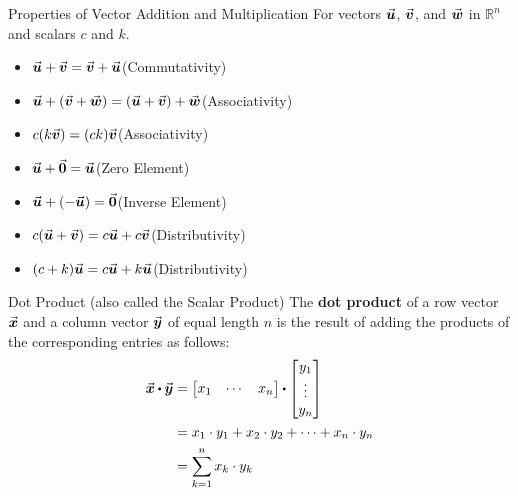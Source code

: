 \documentclass{beamer}
\begin{document}
\begin{frame}
\begin{block}{Properties of Vector Addition and Multiplication}
For vectors ${\vec{\boldsymbol{u}}}$, ${\vec{\boldsymbol{v}}}$, and ${\vec{\boldsymbol{w}}}$ in $\mathbb{R}^n$ and scalars $c$ and $k$.\begin{itemize}
\item ${\vec{\boldsymbol{u}}}+{\vec{\boldsymbol{v}}}={\vec{\boldsymbol{v}}}+{\vec{\boldsymbol{u}}}$\hfill(Commutativity)
\item ${\vec{\boldsymbol{u}}}+({\vec{\boldsymbol{v}}}+{\vec{\boldsymbol{w}}})=({\vec{\boldsymbol{u}}}+{\vec{\boldsymbol{v}}})+{\vec{\boldsymbol{w}}}$\hfill(Associativity)
\item $c(k{\vec{\boldsymbol{v}}})=(ck){\vec{\boldsymbol{v}}}$\hfill(Associativity)
\item ${\vec{\boldsymbol{u}}}+{\vec{\boldsymbol{0}}}={\vec{\boldsymbol{u}}}$\hfill(Zero Element)
\item ${\vec{\boldsymbol{u}}}+(-{\vec{\boldsymbol{u}}})={\vec{\boldsymbol{0}}}$\hfill(Inverse Element)
\item $c({\vec{\boldsymbol{u}}}+{\vec{\boldsymbol{v}}})=c{\vec{\boldsymbol{u}}}+c{\vec{\boldsymbol{v}}}$\hfill(Distributivity)
\item $(c+k){\vec{\boldsymbol{u}}}=c{\vec{\boldsymbol{u}}}+k{\vec{\boldsymbol{u}}}$\hfill(Distributivity)
\end{itemize}
\end{block}
\end{frame}

\begin{frame}
\begin{block}{Dot Product (also called the Scalar Product)}
The \textbf{dot product} of a row vector ${\vec{\boldsymbol{x}}}$ and a column vector ${\vec{\boldsymbol{y}}}$ of equal length $n$ is the result of adding the products of the corresponding entries as follows:
\begin{equation*}
\begin{split}
\vect{x}\pdot\vect{y}&=\begin{bmatrix}x_1&\cdots&x_n\end{bmatrix}\pdot
\begin{bmatrix}y_1\\\vdots\\y_n\end{bmatrix}\\
&=x_1\cdot y_1+x_2\cdot y_2+\cdots +x_n\cdot y_n\\
&=\sum_{k=1}^{n} x_k\cdot y_k
\end{split}
\end{equation*}
\end{block}
\end{frame}
\end{document}
